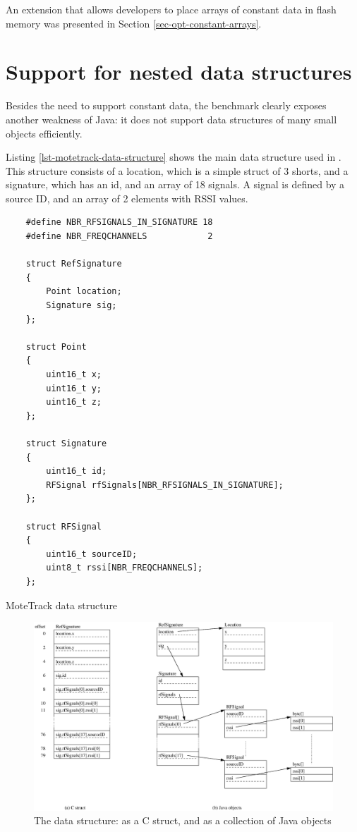 An extension that allows developers to place arrays of constant data in flash memory was presented in Section \ref{sec-opt-constant-arrays}.




\section{Support for nested data structures}
\label{sec-nested-data}
Besides the need to support constant data, the  benchmark clearly exposes another weakness of Java: it does not support data structures of many small objects efficiently.

Listing \ref{lst-motetrack-data-structure} shows the main  data structure used in . This structure consists of a location, which is a simple struct of 3 shorts, and a signature, which has an id, and an array of 18 signals. A signal is defined by a source ID, and an array of 2 elements with RSSI values.

\begin{listing}
\begin{verbatim}
    #define NBR_RFSIGNALS_IN_SIGNATURE 18
    #define NBR_FREQCHANNELS            2

    struct RefSignature
    {
        Point location;
        Signature sig;
    };

    struct Point
    {
        uint16_t x;
        uint16_t y;
        uint16_t z;
    };

    struct Signature
    {
        uint16_t id;
        RFSignal rfSignals[NBR_RFSIGNALS_IN_SIGNATURE];
    };

    struct RFSignal
    {
        uint16_t sourceID;
        uint8_t rssi[NBR_FREQCHANNELS];
    };
\end{verbatim}
\caption{MoteTrack  data structure}
\label{lst-motetrack-data-structure}
\end{listing}

\begin{figure}
\centering
\includegraphics[width=0.9\linewidth]{motetrack-refsignature-objects}
\caption[The  data structure]{The  data structure: as a C struct, and as a collection of Java objects}
\label{fig-motetrack-refsignature-objects}
\end{figure}

